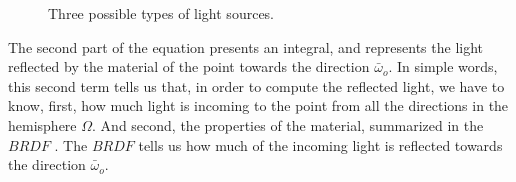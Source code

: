 \documentclass{PoliMi_MasterThesis}
\begin{document}
\begin{figure}[H]
{    }
	\qquad
	\caption{Three possible types of light sources.}
    \label{fig:light_sources}
\end{figure}

The second part of the equation presents an integral, and represents the light reflected by the material of the point towards the direction $\bar{\omega}_o$. In simple words, this second term tells us that, in order to compute the reflected light, we have to know, first, how much light is incoming to the point from all the directions in the hemisphere $\Omega$. And second, the properties of the material, summarized in the $BRDF$ \cite{brdf}. The $BRDF$ tells us how much of the incoming light is reflected towards the direction $\bar{\omega}_o$. 
\end{document}
